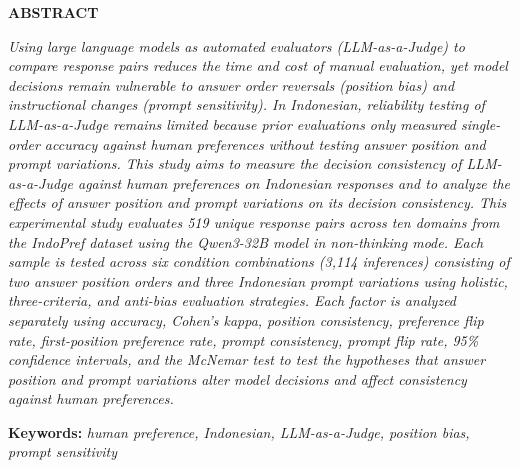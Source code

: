 \begin{center}
\textbf{\large ABSTRACT}\\
\end{center}
\vspace{1cm}

\begingroup
\fontsize{11pt}{13pt}\selectfont
\singlespacing

\textit{Using large language models as automated evaluators (LLM-as-a-Judge) to compare response pairs reduces the time and cost of manual evaluation, yet model decisions remain vulnerable to answer order reversals (position bias) and instructional changes (prompt sensitivity). In Indonesian, reliability testing of LLM-as-a-Judge remains limited because prior evaluations only measured single-order accuracy against human preferences without testing answer position and prompt variations. This study aims to measure the decision consistency of LLM-as-a-Judge against human preferences on Indonesian responses and to analyze the effects of answer position and prompt variations on its decision consistency. This experimental study evaluates 519 unique response pairs across ten domains from the IndoPref dataset using the Qwen3-32B model in non-thinking mode. Each sample is tested across six condition combinations (3,114 inferences) consisting of two answer position orders and three Indonesian prompt variations using holistic, three-criteria, and anti-bias evaluation strategies. Each factor is analyzed separately using accuracy, Cohen's kappa, position consistency, preference flip rate, first-position preference rate, prompt consistency, prompt flip rate, 95\% confidence intervals, and the McNemar test to test the hypotheses that answer position and prompt variations alter model decisions and affect consistency against human preferences.}

\vspace{0.5cm}
\noindent \textbf{Keywords:} \textit{human preference, Indonesian, LLM-as-a-Judge, position bias, prompt sensitivity}
\endgroup